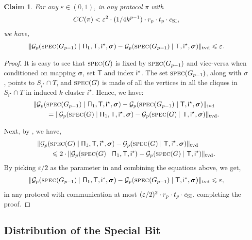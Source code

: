 \documentclass[11pt]{article}
\newtheorem{claim}[lemma]{Claim}
\theoremstyle{definition}
\renewcommand{\leq}{\leqslant}
\newcommand{\tvd}[2]{\ensuremath{\norm{#1 - #2}_{\mathrm{tvd}}}}
\newcommand{\eps}{\ensuremath{\varepsilon}}
\newcommand{\norm}[1]{\ensuremath{\|#1\|}}
\newcommand{\rv}[1]{\ensuremath{{\mathsf{#1}}}\xspace}
\newcommand{\cG}{\ensuremath{\mathcal{G}}}
\newcommand{\spec}{\ensuremath{\textnormal{\textsc{spec}}}}
\newcommand{\istar}{\ensuremath{i^{\star}}}
\newcommand{\prot}{\ensuremath{\pi}}
\newcommand{\Prot}{\ensuremath{\Pi}}
\newcommand{\rProt}{\ensuremath{\rv{\Prot}}}
\newcommand{\rT}{\ensuremath{\rv{T}}}
\newcommand{\rsigma}{\ensuremath{\bm{\sigma}}}
\begin{document}
	\begin{claim}\label{clm:set-int-final}
		For any $\eps \in (0,1)$, in any protocol $\prot$ with  $$CC(\prot) < \eps^2 \cdot (1/4k^{p-1}) \cdot r_p \cdot t_p \cdot \cSI,$$ we have, 
	\[
	\tvd{\cG_p(\spec(G_{p-1}) \mid \rProt_1,  \rT, \ristar, \rsigma)}{\cG_p(\spec(G_{p-1}) \mid  \rT, \ristar, \rsigma)} \leq \eps.
	\]
	\end{claim}
	
	\begin{proof}
		It is easy to see that $\spec(G)$ is fixed by $\spec(G_{p-1})$ and vice-versa when conditioned on mapping $\rsigma$, set $\rT$ and index $\ristar$.
		The set $\spec(G_{p-1})$, along with $\sigma$, points to $S_{\istar} \cap T$, and $\spec(G)$ is made of all the vertices in all the cliques in $S_{\istar} \cap T$ in induced $k$-cluster $\istar$. 		Hence, we have:
		\begin{align*}
		&\tvd{\cG_p(\spec(G_{p-1}) \mid \rProt_1,  \rT, \ristar, \rsigma)}{\cG_p(\spec(G_{p-1}) \mid  \rT, \ristar, \rsigma)}  \\
		&\hspace{20pt}= \tvd{\cG_p(\spec(G) \mid \rProt_1,  \rT, \ristar, \rsigma)}{\cG_p(\spec(G) \mid  \rT, \ristar, \rsigma)}.  
		\end{align*}
		
	Next, by , we have, 
		\begin{align*}
	&	\tvd{\cG_p(\spec(G) \mid \rProt_1,  \rT, \ristar, \rsigma)}{\cG_p(\spec(G) \mid  \rT, \ristar, \rsigma)} \\
	&\hspace{20pt}\leq 2 \cdot \tvd{\cG_p(\spec(G) \mid \rProt_1,  \rT, \ristar)}{\cG_p(\spec(G) \mid  \rT, \ristar)}. 
		\end{align*}
		By picking $\eps/2$ as the parameter in  and combining the equations above, we get, 
		\begin{align*}
		\tvd{\cG_p(\spec(G_{p-1}) \mid \rProt_1,  \rT, \ristar, \rsigma)}{\cG_p(\spec(G_{p-1}) \mid  \rT, \ristar, \rsigma)} \leq \eps,
		\end{align*}
		in any protocol with communication at most $(\eps/2)^2 \cdot r_p \cdot t_p \cdot \cSI$, completing the proof. 
	\end{proof}
	\subsection{Distribution of the Special Bit}\label{subsec:adv-specbit}
	
\end{document}
